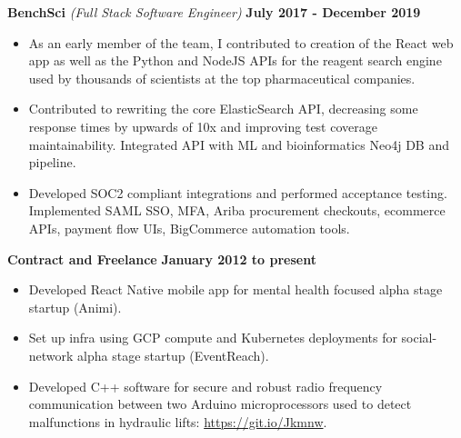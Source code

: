 \documentclass{article}
\begin{document}
{\bf  BenchSci } \textit{(Full Stack Software Engineer)} \hfill {\bf July 2017 - December 2019 \/}
\begin{itemize}[leftmargin=*]
    \itemsep0em
    \renewcommand\labelitemi{\tiny$\bullet$}
    \item As an early member of the team, I contributed to creation of the React web app as well as the Python and NodeJS APIs for the reagent search engine used by thousands of scientists at the top pharmaceutical companies.
    \item Contributed to rewriting the core ElasticSearch API, decreasing some response times by upwards of 10x and improving test coverage maintainability. Integrated API with ML and bioinformatics Neo4j DB and pipeline.
    \item Developed SOC2 compliant integrations and performed acceptance testing. Implemented SAML SSO, MFA, Ariba procurement checkouts, ecommerce APIs, payment flow UIs, BigCommerce automation tools.

\end{itemize}


{\bf Contract and Freelance} \hfill {\bf January 2012 to present\/} 
\begin{itemize}[leftmargin=*]
    \itemsep0em
    \renewcommand\labelitemi{\tiny$\bullet$}
    \item Developed React Native mobile app for mental health focused alpha stage startup (Animi).
    \item Set up infra using GCP compute and Kubernetes deployments for social-network alpha stage startup (EventReach). 
    \item Developed C++ software for secure and robust radio frequency communication between two Arduino microprocessors used to detect malfunctions in hydraulic lifts: \url{https://git.io/Jkmnw}.
\end{itemize}
\end{document}
